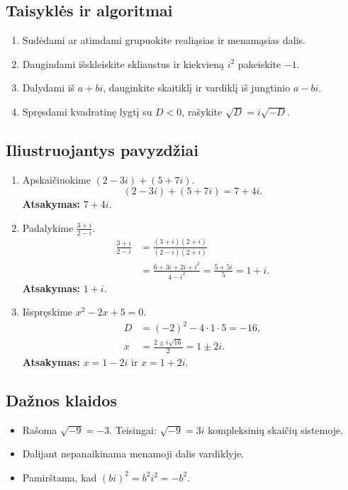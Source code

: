 \subsection{Taisyklės ir algoritmai}
\begin{enumerate}[label=\arabic*.]
\item Sudėdami ar atimdami grupuokite realiąsias ir menamąsias dalis.
\item Daugindami išskleiskite skliaustus ir kiekvieną \(i^2\) pakeiskite \(-1\).
\item Dalydami iš \(a+bi\), dauginkite skaitiklį ir vardiklį iš jungtinio \(a-bi\).
\item Spręsdami kvadratinę lygtį su \(D<0\), rašykite \(\sqrt{D}=i\sqrt{-D}\).
\end{enumerate}

\subsection{Iliustruojantys pavyzdžiai}
\begin{enumerate}[label=\arabic*.]
\item Apskaičiuokime \((2-3i)+(5+7i)\).
\[
(2-3i)+(5+7i)=7+4i.
\]
\textbf{Atsakymas:} \(7+4i\).

\item Padalykime \(\frac{3+i}{2-i}\).
\begin{align}
\frac{3+i}{2-i}
&=\frac{(3+i)(2+i)}{(2-i)(2+i)}\\
&=\frac{6+3i+2i+i^2}{4-i^2}
=\frac{5+5i}{5}=1+i.
\end{align}
\textbf{Atsakymas:} \(1+i\).

\item Išspręskime \(x^2-2x+5=0\).
\begin{align}
D&=(-2)^2-4\cdot1\cdot5=-16,\\
x&=\frac{2\pm i\sqrt{16}}{2}=1\pm2i.
\end{align}
\textbf{Atsakymas:} \(x=1-2i\) ir \(x=1+2i\).
\end{enumerate}

\subsection{Dažnos klaidos}
\begin{itemize}
\item Rašoma \(\sqrt{-9}=-3\). Teisingai: \(\sqrt{-9}=3i\) kompleksinių skaičių sistemoje.
\item Dalijant nepanaikinama menamoji dalis vardiklyje.
\item Pamirštama, kad \((bi)^2=b^2i^2=-b^2\).
\end{itemize}

